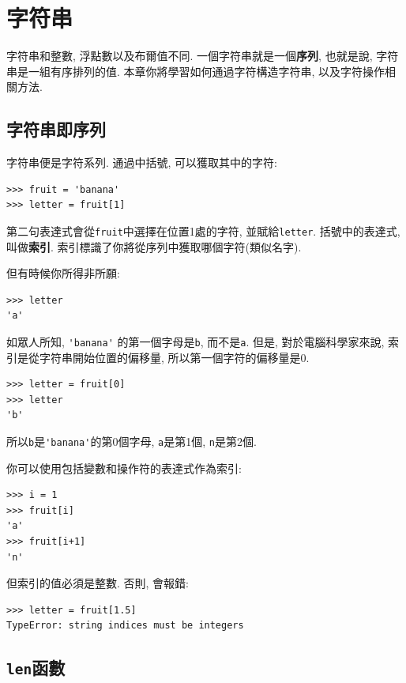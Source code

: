 \documentclass[10pt]{book}
\begin{document}
\chapter{字符串}
\label{strings}

字符串和整數, 浮點數以及布爾值不同. 
一個字符串就是一個{\bf 序列}, 也就是說, 字符串是一組有序排列的值. 
本章你將學習如何通過字符構造字符串, 以及字符操作相關方法. 


\section{字符串即序列}

字符串便是字符系列. 
通過中括號, 可以獲取其中的字符:

\begin{verbatim}
>>> fruit = 'banana'
>>> letter = fruit[1]
\end{verbatim}
%
第二句表達式會從{\tt fruit}中選擇在位置1處的字符, 並賦給{\tt letter}. 
括號中的表達式, 叫做{\bf 索引}.
索引標識了你將從序列中獲取哪個字符(類似名字).

但有時候你所得非所願:

\begin{verbatim}
>>> letter
'a'
\end{verbatim}
%
如眾人所知,  \verb"'banana'" 的第一個字母是{\tt b}, 
而不是{\tt a}. 但是, 對於電腦科學家來說, 索引是從字符串開始位置的偏移量, 
所以第一個字符的偏移量是0.

\begin{verbatim}
>>> letter = fruit[0]
>>> letter
'b'
\end{verbatim}
%
所以{\tt b}是\verb"'banana'"的第0個字母,  {\tt a}是第1個, {\tt n}是第2個. 
 

你可以使用包括變數和操作符的表達式作為索引:

\begin{verbatim}
>>> i = 1
>>> fruit[i]
'a'
>>> fruit[i+1]
'n'
\end{verbatim}
%
但索引的值必須是整數. 否則, 會報錯:

\begin{verbatim}
>>> letter = fruit[1.5]
TypeError: string indices must be integers
\end{verbatim}
%

\section{{\tt len}函數}
\end{document}
